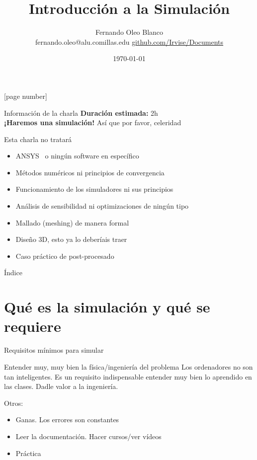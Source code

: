 \documentclass[12pt]{beamer}
\begin{document}
	\author{Fernando Oleo Blanco \\ fernando.oleo@alu.comillas.edu \hfill 	\href{https://github.com/Irvise/Documents}{github.com/Irvise/Documents}}
	\title{Introducción a la Simulación}
	\date{\today}
	[page number]
\begin{frame}[plain]
	\maketitle
\end{frame}

\begin{frame}{Información de la charla}
	\textbf{Duración estimada:} 2h \\
	\textbf{¡Haremos una simulación!} Así que por favor, celeridad
	
	\begin{block}{Esta charla no tratará}
		\begin{itemize}
			\item ANSYS \textregistered\ o ningún software en específico
			\item Métodos numéricos ni principios de convergencia
			\item Funcionamiento de los simuladores ni sus principios
			\item Análisis de sensibilidad ni optimizaciones de ningún tipo
			\item Mallado (meshing) de manera formal
			\item Diseño 3D, esto ya lo deberíais traer
			\item Caso práctico de post-procesado
		\end{itemize}
	\end{block}
\end{frame}

\begin{frame}{Índice}
	\setcounter{tocdepth}{2}
	\tableofcontents
\end{frame}

\section{Qué es la simulación y qué se requiere}

\begin{frame}{Requisitos mínimos para simular}
	\begin{block}{Entender muy, muy bien la física/ingeniería del problema}
		Los ordenadores no son tan inteligentes. Es un requisito indispensable entender muy bien lo aprendido en las clases. Dadle valor a la ingeniería.
	\end{block}
	Otros:
	\begin{itemize}
		\item Ganas. Los errores son constantes
		\item Leer la documentación. Hacer cursos/ver vídeos
		\item Práctica
	\end{itemize}
\end{frame}
\end{document}
